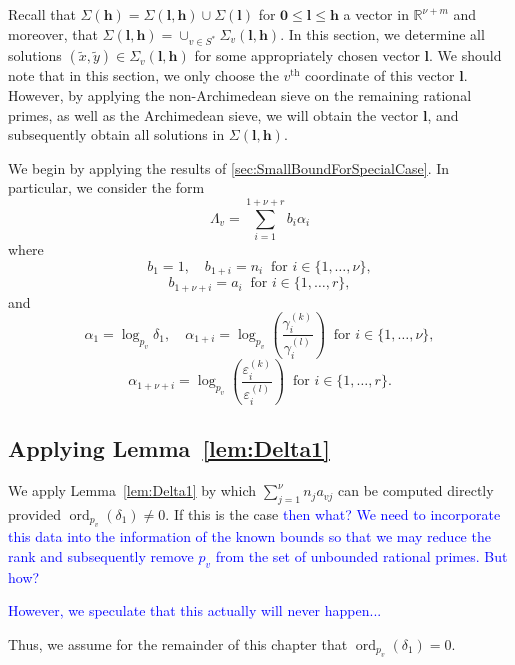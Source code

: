 \documentclass[11pt]{report}
\theoremstyle{definition}
\DeclareMathOperator{\ord}{ord}
\newcommand{\edit}[1]{\textcolor{blue}{#1}}
\begin{document}
Recall that $\Sigma(\mathbf{h}) = \Sigma(\mathbf{l},\mathbf{h}) \cup \Sigma(\mathbf{l})$ for $\mathbf{0} \leq \mathbf{l} \leq \mathbf{h}$ a vector in $\mathbb{R}^{\nu + m}$ and moreover, that
$\Sigma(\mathbf{l},\mathbf{h}) = \cup_{v \in S^*}\Sigma_v(\mathbf{l},\mathbf{h})$. In this section, we determine all solutions $(\tilde{x}, \tilde{y}) \in \Sigma_v(\mathbf{l},\mathbf{h})$ for some appropriately chosen vector $\mathbf{l}$. We should note that in this section, we only choose the $v^{\text{th}}$ coordinate of this vector $\mathbf{l}$. However, by applying the non-Archimedean sieve on the remaining rational primes, as well as the Archimedean sieve, we will obtain the vector $\mathbf{l}$, and subsequently obtain all solutions in $\Sigma(\mathbf{l},\mathbf{h})$.

We begin by applying the results of \autoref{sec:SmallBoundForSpecialCase}. In particular, we consider the form
\[\Lambda_v = \sum_{i = 1}^{1+\nu+r} b_i\alpha_i\]
where
\[b_1 = 1, \quad b_{1+i} = n_i \ \text{ for } i \in \{1, \dots, \nu\},\]
\[ b_{1 + \nu+i} = a_i \ \text{ for } i \in \{1, \dots, r\},\]
and
\[\alpha_1 = \log_{p_v} \delta_1, \quad \alpha_{1+i} = \log_{p_v}\left( \frac{\gamma_i^{(k)}}{\gamma_i^{(l)}}\right)  \ \text{ for } i \in \{1, \dots, \nu\},\]
\[\alpha_{1+ \nu+i} = \log_{p_v}\left( \frac{\varepsilon_i^{(k)}}{\varepsilon_i^{(l)}}\right)
\ \text{ for } i \in \{1, \dots, r\}.\]


\subsection{Applying Lemma~\ref{lem:Delta1}}
\label{sec:apply-lemma-refl-1}

We apply Lemma~\ref{lem:Delta1} by which $\sum_{j = 1}^{\nu} n_ja_{vj}$ can be computed directly provided ${\ord_{p_v}(\delta_1) \neq 0}$. If this is the case \edit{then what? We need to incorporate this data into the information of the known bounds so that we may reduce the rank and subsequently remove $p_{v}$ from the set of unbounded rational primes. But how?}

\edit{However, we speculate that this actually will never happen...}

Thus, we assume for the remainder of this chapter that $\ord_{p_v}(\delta_1) = 0$.

\end{document}
